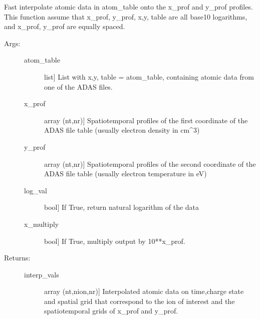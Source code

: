 \documentclass[letterpaper,10pt,english]{sphinxmanual}
\begin{document}
\begin{fulllineitems}
\label{\detokenize{aurora:aurora.atomic.interp_atom_prof}}
Fast interpolate atomic data in atom\_table onto the x\_prof and y\_prof profiles.
This function assume that x\_prof, y\_prof, x,y, table are all base\sphinxhyphen{}10 logarithms,
and x\_prof, y\_prof are equally spaced.
\begin{description}
\item[{Args:}] \leavevmode\begin{description}
\item[{atom\_table}] \leavevmode{[}list{]}
List with x,y, table = atom\_table, containing atomic data from one of the ADAS files.

\item[{x\_prof}] \leavevmode{[}array (nt,nr){]}
Spatio\sphinxhyphen{}temporal profiles of the first coordinate of the ADAS file table (usually 
electron density in cm\textasciicircum{}\sphinxhyphen{}3)

\item[{y\_prof}] \leavevmode{[}array (nt,nr){]}
Spatio\sphinxhyphen{}temporal profiles of the second coordinate of the ADAS file table (usually 
electron temperature in eV)

\item[{log\_val}] \leavevmode{[}bool{]}
If True, return natural logarithm of the data

\item[{x\_multiply}] \leavevmode{[}bool{]}
If True, multiply output by 10**x\_prof.

\end{description}

\item[{Returns:}] \leavevmode\begin{description}
\item[{interp\_vals}] \leavevmode{[}array (nt,nion,nr){]}
Interpolated atomic data on time,charge state and spatial grid that correspond to the 
ion of interest and the spatiotemporal grids of x\_prof and y\_prof.

\end{description}

\end{description}

\end{fulllineitems}
\end{document}
